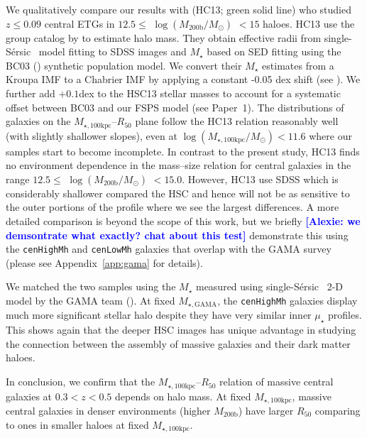 \documentclass[a4paper,fleqn,usenatbib]{mnras}
\def\ser{{S\'{e}rsic\ }}
\def\rbcg{\texttt{cenHighMh}}
\def\nbcg{\texttt{cenLowMh}}
\def\mstar{{$M_{\star}$}}
\def\mhalo{{$M_{\mathrm{200b}}$}}
\def\logmh{{$\log (M_{\mathrm{200b}}/M_{\odot})$}}
\def\mtot{{$M_{\star,100\mathrm{kpc}}$}}
\def\mgama{{$M_{\star,\mathrm{GAMA}}$}}
\def\logmtot{{$\log (M_{\star,100\mathrm{kpc}}/M_{\odot})$}}
\def\mden{{$\mu_{\star}$}}
\newcommand{\alexie}[1]{\textcolor{blue}{\textbf{[Alexie: #1]}}}
\begin{document}
    We qualitatively compare our results with \citealt{HCompany13} (HC13; 
    green solid line) who studied $z\leq 0.09$ central ETGs in 
    $12.5 \le$ \logmh{} $< 15$ haloes. 
    HC13 use the group catalog by \citet{Yang2007} to estimate halo mass. They obtain effective radii from  single-\ser{} model fitting to SDSS 
    images and \mstar{} based on SED fitting using the BC03 (\citealt{BC03}) 
    synthetic population model. We convert their \mstar{} estimates from a Kroupa IMF to a Chabrier 
    IMF by applying a constant -0.05 dex shift (see \citealt{Bernardi2016a}). We further add $+0.1$dex to the HSC13 stellar masses to account for a systematic offset between BC03 and our FSPS model (see Paper~1). 
    The distributions of galaxies on the 
    \mtot{}--$R_{\mathrm{50}}$ plane follow the HC13 relation reasonably well 
    (with slightly shallower slopes), even at \logmtot{}$< 11.6$ where our samples 
    start to become incomplete. 
    In contrast to the present study, HC13 finds no environment dependence in the 
    mass--size relation for central galaxies in the range $12.5\le$ \logmh{} $<15.0$. However, HC13 use SDSS which is considerably shallower compared the HSC and hence will not be as sensitive to the outer portions of the profile where we see the largest differences. A more detailed comparison is beyond the scope of this work, but we briefly \alexie{we demsontrate what exactly? chat about this test}
    demonstrate this using the \rbcg{} and \nbcg{} galaxies that overlap with the GAMA
    survey (please see Appendix~\ref{app:gama} for details).
    
    
    We matched the two samples using the \mstar{} measured using single-\ser{} 2-D
    model by the GAMA team (\citealt{Kelvin2012}). 
    At fixed \mgama{}, the \rbcg{} galaxies display much more significant stellar 
    halo despite they have very similar inner \mden{} profiles.  
    This shows again that the deeper HSC images has unique advantage in studying the
    connection between the assembly of massive galaxies and their dark matter haloes. 

    In conclusion, we confirm that the \mtot{}--$R_{\mathrm{50}}$ relation of massive
    central galaxies at $0.3 < z < 0.5$ depends on halo mass. 
    At fixed \mtot{}, massive central galaxies in denser environments (higher \mhalo{}) 
    have larger $R_{\mathrm{50}}$ comparing to ones in smaller haloes at fixed 
    \mtot{}. 
    
\end{document}

